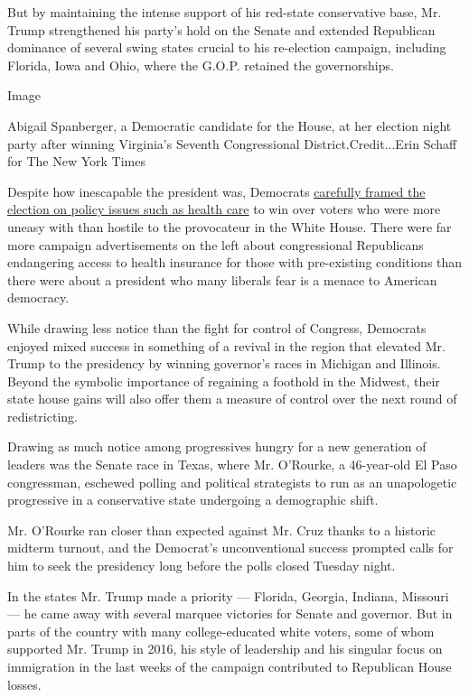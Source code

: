 But by maintaining the intense support of his red-state conservative
base, Mr. Trump strengthened his party's hold on the Senate and extended
Republican dominance of several swing states crucial to his re-election
campaign, including Florida, Iowa and Ohio, where the G.O.P. retained
the governorships.

Image

Abigail Spanberger, a Democratic candidate for the House, at her
election night party after winning Virginia's Seventh Congressional
District.Credit...Erin Schaff for The New York Times

Despite how inescapable the president was, Democrats
\href{https://www.nytimes.com/2018/10/28/us/politics/health-care-elections-democrats.html}{carefully
framed the election on policy issues such as health care} to win over
voters who were more uneasy with than hostile to the provocateur in the
White House. There were far more campaign advertisements on the left
about congressional Republicans endangering access to health insurance
for those with pre-existing conditions than there were about a president
who many liberals fear is a menace to American democracy.

While drawing less notice than the fight for control of Congress,
Democrats enjoyed mixed success in something of a revival in the region
that elevated Mr. Trump to the presidency by winning governor's races in
Michigan and Illinois. Beyond the symbolic importance of regaining a
foothold in the Midwest, their state house gains will also offer them a
measure of control over the next round of redistricting.

Drawing as much notice among progressives hungry for a new generation of
leaders was the Senate race in Texas, where Mr. O'Rourke, a 46-year-old
El Paso congressman, eschewed polling and political strategists to run
as an unapologetic progressive in a conservative state undergoing a
demographic shift.

Mr. O'Rourke ran closer than expected against Mr. Cruz thanks to a
historic midterm turnout, and the Democrat's unconventional success
prompted calls for him to seek the presidency long before the polls
closed Tuesday night.

In the states Mr. Trump made a priority --- Florida, Georgia, Indiana,
Missouri --- he came away with several marquee victories for Senate and
governor. But in parts of the country with many college-educated white
voters, some of whom supported Mr. Trump in 2016, his style of
leadership and his singular focus on immigration in the last weeks of
the campaign contributed to Republican House losses.

